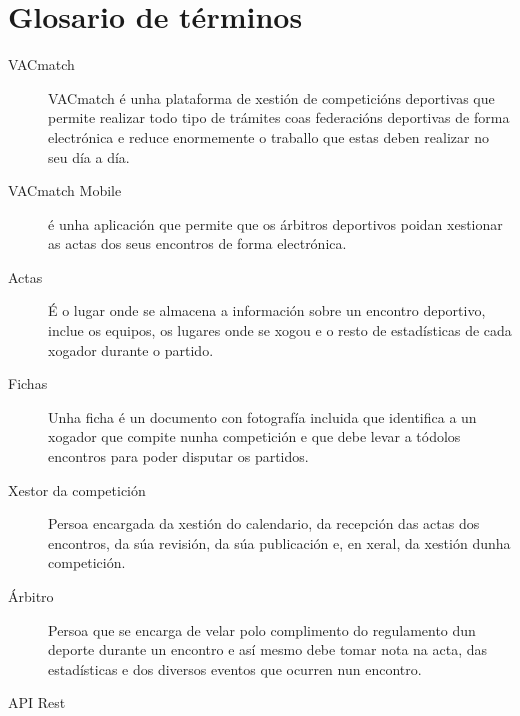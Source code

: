 \chapter{Glosario de términos}
\label{chap:glosario-terminos}


\begin{description}
  \item [VACmatch] VACmatch é unha plataforma de xestión de competicións deportivas que 
permite realizar todo tipo de trámites coas federacións deportivas de forma electrónica e 
reduce enormemente o traballo que estas deben realizar no seu día a día.
  \item [VACmatch Mobile] é unha aplicación que permite que os árbitros deportivos 
poidan xestionar as actas dos seus encontros de forma electrónica.
  \item [Actas] É o lugar onde se almacena a información sobre un encontro 
deportivo, inclue os equipos, os lugares onde se xogou e o resto de estadísticas de cada 
xogador durante o partido.
  \item [Fichas] Unha ficha é un documento con fotografía incluida que identifica a un 
xogador que compite nunha competición e que debe levar a tódolos encontros para poder 
disputar os partidos.
  \item [Xestor da competición] Persoa encargada da xestión do calendario, da recepción 
das actas dos encontros, da súa revisión, da súa publicación e, en xeral, da xestión dunha 
competición.
  \item [Árbitro] Persoa que se encarga de velar polo complimento do regulamento dun 
deporte durante un encontro e así mesmo debe tomar nota na acta, das estadísticas e dos 
diversos eventos que ocurren nun encontro.
 \item [API Rest]
\end{description}
